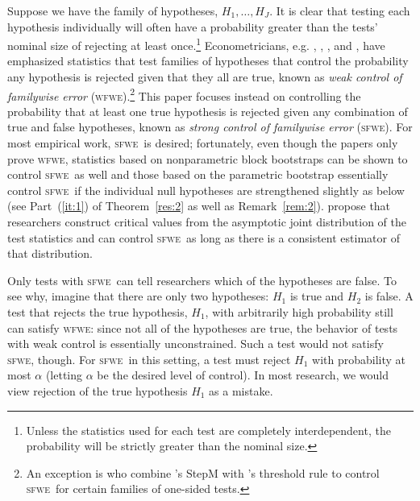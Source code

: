\documentclass[11pt,fleqn]{article}
\newcommand\citepos[2][]{\citeauthor{#2}'s \citeyearpar[#1]{#2}}
\theoremstyle{definition}
\newcommand{\sfwe}{\textsc{sfwe}}
\newcommand{\wfwe}{\textsc{wfwe}}
\begin{document}
Suppose we have the family of hypotheses, $H_1,\dots,H_J$.  It is
clear that testing each hypothesis individually will often have a
probability greater than the tests' nominal size of rejecting at least
once.\footnote{Unless the statistics used for each test are completely
  interdependent, the probability will be strictly greater than the
  nominal size.}  Econometricians, e.g. \citet{Whi:00},
\citet{Han:05}, \cite{HuW:10}, and \citet{ClM:12b}, have emphasized
statistics that test families of hypotheses that control the
probability any hypothesis is rejected given that they all are true,
known as \textit{weak control of familywise error}
(\wfwe).\footnote{An exception is \citet{HHK:10} who combine
  \citepos{RoW:05} StepM with \citepos{Han:05} threshold rule to
  control \sfwe\ for certain families of one-sided tests.}  This paper
focuses instead on controlling the probability that at least one true
hypothesis is rejected given any combination of true and false
hypotheses, known as \textit{strong control of familywise error}
(\sfwe).  For most empirical work, \sfwe\ is desired; fortunately,
even though the papers only prove \wfwe, statistics based on
nonparametric block bootstraps \citep{Whi:00,Han:05} can be shown to
control \sfwe\ as well \citep[this follows directly from][]{RoW:05}
and those based on the parametric bootstrap \citep{ClM:12b} essentially
control \sfwe\ if the individual null hypotheses are strengthened
slightly as below (see Part~(\ref{it:1}) of Theorem~\ref{res:2} as
well as Remark~\ref{rem:2}).  \citet{HuW:10} propose that researchers
construct critical values from the asymptotic joint distribution of
the test statistics and can control \sfwe\ as long as there is a
consistent estimator of that distribution.

Only tests with \sfwe\ can tell researchers which of the hypotheses
are false.  To see why, imagine that there are only two hypotheses:
$H_1$ is true and $H_2$ is false.  A test that rejects the true
hypothesis, $H_1$, with arbitrarily high probability still can satisfy
\wfwe: since not all of the hypotheses are true, the behavior of tests
with weak control is essentially unconstrained.  Such a test would not
satisfy \sfwe, though.  For \sfwe\ in this setting, a test must reject
$H_1$ with probability at most $\alpha$ (letting $\alpha$ be the
desired level of control).  In most research, we would view rejection
of the true hypothesis $H_1$ as a mistake.
\end{document}
